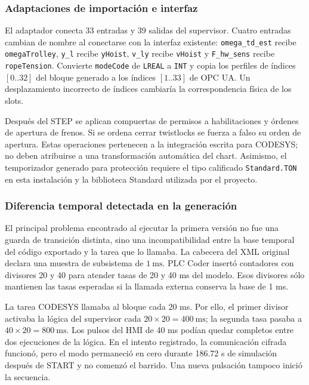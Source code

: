 \documentclass[a4paper,10pt,onecolumn,journal]{ieeeconf}
\numberwithin{equation}{section}
\begin{document}

\subsubsection{Adaptaciones de importación e interfaz}
El adaptador conecta 33 entradas y 39 salidas del supervisor. Cuatro entradas cambian de nombre al conectarse con la interfaz existente: \texttt{omega\_td\_est} recibe \texttt{omegaTrolley}, \texttt{y\_l} recibe \texttt{yHoist}, \texttt{v\_ly} recibe \texttt{vHoist} y \texttt{F\_hw\_sens} recibe \texttt{ropeTension}. Convierte \texttt{modeCode} de \texttt{LREAL} a \texttt{INT} y copia los perfiles de índices $[0..32]$ del bloque generado a los índices $[1..33]$ de OPC UA. Un desplazamiento incorrecto de índices cambiaría la correspondencia física de los slots.

Después del STEP se aplican compuertas de permisos a habilitaciones y órdenes de apertura de frenos. Si se ordena cerrar twistlocks se fuerza a falso su orden de apertura. Estas operaciones pertenecen a la integración escrita para CODESYS; no deben atribuirse a una transformación automática del chart. Asimismo, el temporizador generado para protección requiere el tipo calificado \texttt{Standard.TON} en esta instalación y la biblioteca Standard utilizada por el proyecto.


\subsubsection{Diferencia temporal detectada en la generación}
El principal problema encontrado al ejecutar la primera versión no fue una guarda de transición distinta, sino una incompatibilidad entre la base temporal del código exportado y la tarea que lo llamaba. La cabecera del XML original declara una muestra de subsistema de $1~\mathrm{ms}$. PLC Coder insertó contadores con divisores 20 y 40 para atender tasas de 20 y 40 ms del modelo. Esos divisores sólo mantienen las tasas esperadas si la llamada externa conserva la base de 1 ms.

La tarea CODESYS llamaba al bloque cada 20 ms. Por ello, el primer divisor activaba la lógica del supervisor cada $20\times20=400~\mathrm{ms}$; la segunda tasa pasaba a $40\times20=800~\mathrm{ms}$. Los pulsos del HMI de 40 ms podían quedar completos entre dos ejecuciones de la lógica. En el intento registrado, la comunicación cifrada funcionó, pero el modo permaneció en cero durante 186.72 s de simulación después de START y no comenzó el barrido. Una nueva pulsación tampoco inició la secuencia.
\end{document}

